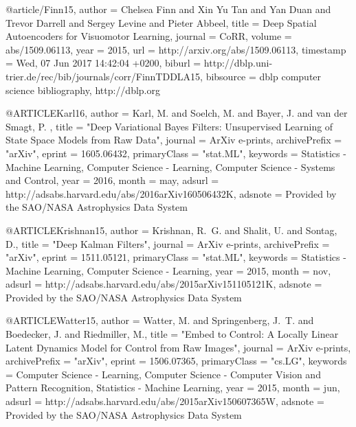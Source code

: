 @article{/Finn15,
  author    = {Chelsea Finn and
               Xin Yu Tan and
               Yan Duan and
               Trevor Darrell and
               Sergey Levine and
               Pieter Abbeel},
  title     = {Deep Spatial Autoencoders for Visuomotor Learning},
  journal   = {CoRR},
  volume    = {abs/1509.06113},
  year      = {2015},
  url       = {http://arxiv.org/abs/1509.06113},
  timestamp = {Wed, 07 Jun 2017 14:42:04 +0200},
  biburl    = {http://dblp.uni-trier.de/rec/bib/journals/corr/FinnTDDLA15},
  bibsource = {dblp computer science bibliography, http://dblp.org}
}


@ARTICLE{Karl16,
   author = {{Karl}, M. and {Soelch}, M. and {Bayer}, J. and {van der Smagt}, P.
	},
    title = "{Deep Variational Bayes Filters: Unsupervised Learning of State Space Models from Raw Data}",
  journal = {ArXiv e-prints},
archivePrefix = "arXiv",
   eprint = {1605.06432},
 primaryClass = "stat.ML",
 keywords = {Statistics - Machine Learning, Computer Science - Learning, Computer Science - Systems and Control},
     year = 2016,
    month = may,
   adsurl = {http://adsabs.harvard.edu/abs/2016arXiv160506432K},
  adsnote = {Provided by the SAO/NASA Astrophysics Data System}
}

@ARTICLE{Krishnan15,
   author = {{Krishnan}, R.~G. and {Shalit}, U. and {Sontag}, D.},
    title = "{Deep Kalman Filters}",
  journal = {ArXiv e-prints},
archivePrefix = "arXiv",
   eprint = {1511.05121},
 primaryClass = "stat.ML",
 keywords = {Statistics - Machine Learning, Computer Science - Learning},
     year = 2015,
    month = nov,
   adsurl = {http://adsabs.harvard.edu/abs/2015arXiv151105121K},
  adsnote = {Provided by the SAO/NASA Astrophysics Data System}
}

@ARTICLE{Watter15,
   author = {{Watter}, M. and {Springenberg}, J.~T. and {Boedecker}, J. and 
	{Riedmiller}, M.},
    title = "{Embed to Control: A Locally Linear Latent Dynamics Model for Control from Raw Images}",
  journal = {ArXiv e-prints},
archivePrefix = "arXiv",
   eprint = {1506.07365},
 primaryClass = "cs.LG",
 keywords = {Computer Science - Learning, Computer Science - Computer Vision and Pattern Recognition, Statistics - Machine Learning},
     year = 2015,
    month = jun,
   adsurl = {http://adsabs.harvard.edu/abs/2015arXiv150607365W},
  adsnote = {Provided by the SAO/NASA Astrophysics Data System}
}

